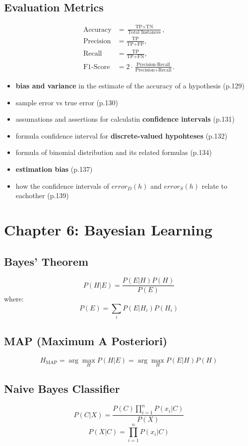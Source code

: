 \documentclass[10pt,a4paper]{article}
\begin{document}
\subsection*{Evaluation Metrics}
\begin{align*}
	\text{Accuracy} &= \frac{\text{TP} + \text{TN}}{\text{Total Instances}}, \\
	\text{Precision} &= \frac{\text{TP}}{\text{TP} + \text{FP}}, \\
	\text{Recall} &= \frac{\text{TP}}{\text{TP} + \text{FN}}, \\
	\text{F1-Score} &= 2 \cdot \frac{\text{Precision} \cdot \text{Recall}}{\text{Precision} + \text{Recall}}.
\end{align*}
\begin{itemize}
	\item \textbf{bias and variance} in the estimate of the accuracy of a hypothesis (p.129)
	\item sample error vs true error (p.130)
	\item assumations and assertions for calculatin \textbf{confidence intervals} (p.131)
	\item formula confidence interval for \textbf{discrete-valued hypohteses} (p.132)
	\item formula of binomial distribution and its related formulas (p.134)
	\item \textbf{estimation bias} (p.137)
	\item how the confidence intervals of $error_{D}(h)$ and $error_{S}(h)$ relate to eachother (p.139)
\end{itemize}
\section*{Chapter 6: Bayesian Learning}
\subsection*{Bayes' Theorem}
\[
P(H|E) = \frac{P(E|H)P(H)}{P(E)}
\]
where:
\[
P(E) = \sum_i P(E|H_i)P(H_i)
\]

\subsection*{MAP (Maximum A Posteriori)}
\[
H_{\text{MAP}} = \arg\max_H P(H|E) = \arg\max_H P(E|H)P(H)
\]

\subsection*{Naive Bayes Classifier}
\[
P(C|X) = \frac{P(C)\prod_{i=1}^{n}P(x_i|C)}{P(X)}
\]
\[
P(X|C) = \prod_{i=1}^{n}P(x_i|C)
\]
\end{document}
